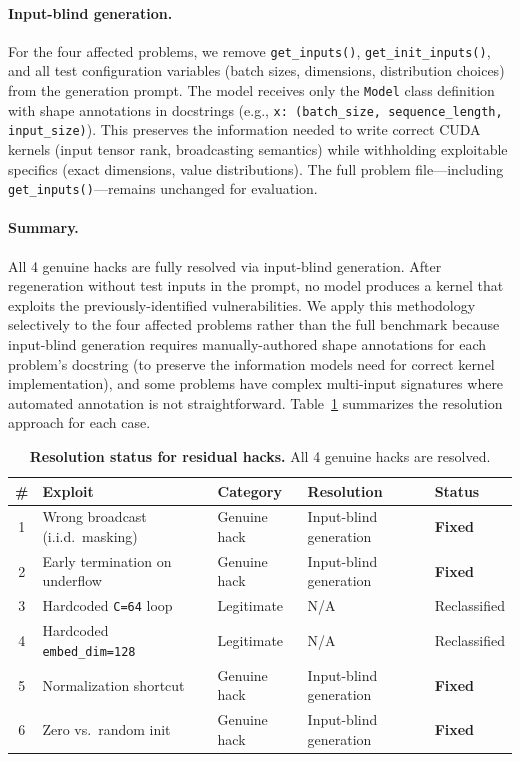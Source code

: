 \documentclass[11pt]{article}
\begin{document}
\paragraph{Input-blind generation.} For the four affected problems, we remove \texttt{get\_inputs()}, \texttt{get\_init\_inputs()}, and all test configuration variables (batch sizes, dimensions, distribution choices) from the generation prompt. The model receives only the \texttt{Model} class definition with shape annotations in docstrings (e.g., \texttt{x: (batch\_size, sequence\_length, input\_size)}). This preserves the information needed to write correct CUDA kernels (input tensor rank, broadcasting semantics) while withholding exploitable specifics (exact dimensions, value distributions). The full problem file---including \texttt{get\_inputs()}---remains unchanged for evaluation.

\paragraph{Summary.} All 4 genuine hacks are fully resolved via input-blind generation. After regeneration without test inputs in the prompt, no model produces a kernel that exploits the previously-identified vulnerabilities. We apply this methodology selectively to the four affected problems rather than the full benchmark because input-blind generation requires manually-authored shape annotations for each problem's docstring (to preserve the information models need for correct kernel implementation), and some problems have complex multi-input signatures where automated annotation is not straightforward. Table~\ref{tab:hack_resolution} summarizes the resolution approach for each case.

\begin{table}[H]
\centering
\caption{\textbf{Resolution status for residual hacks.} All 4 genuine hacks are resolved.}
\label{tab:hack_resolution}\small
\begin{tabular}{cllll}
\toprule
\textbf{\#} & \textbf{Exploit} & \textbf{Category} & \textbf{Resolution} & \textbf{Status} \\
\midrule
1 & Wrong broadcast (i.i.d.\ masking) & Genuine hack & Input-blind generation & \textbf{Fixed} \\
2 & Early termination on underflow & Genuine hack & Input-blind generation & \textbf{Fixed} \\
3 & Hardcoded \texttt{C=64} loop & Legitimate & N/A & Reclassified \\
4 & Hardcoded \texttt{embed\_dim=128} & Legitimate & N/A & Reclassified \\
5 & Normalization shortcut & Genuine hack & Input-blind generation & \textbf{Fixed} \\
6 & Zero vs.\ random init & Genuine hack & Input-blind generation & \textbf{Fixed} \\
\bottomrule
\end{tabular}
\end{table}
\end{document}
